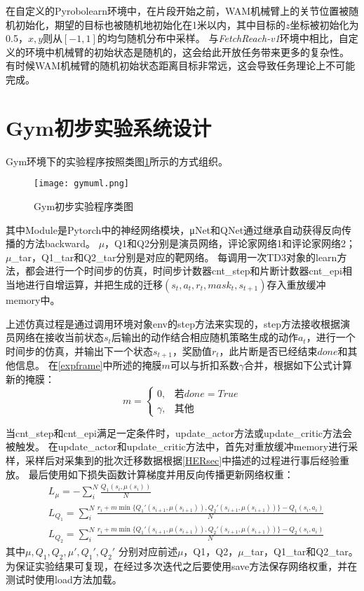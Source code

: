 在自定义的Pyrobolearn环境中，在片段开始之前，WAM机械臂上的关节位置被随机初始化，期望的目标也被随机地初始化在1米以内，其中目标的$z$坐标被初始化为0.5，$x,y$则从$[-1,1]$的均匀随机分布中采样。
与\emph{FetchReach-v1}环境中相比，自定义的环境中机械臂的初始状态是随机的，这会给此开放任务带来更多的复杂性。
有时候WAM机械臂的随机初始状态距离目标非常远，这会导致任务理论上不可能完成。

\section{Gym初步实验系统设计}\label{gymexp}

Gym环境下的实验程序按照类图\ref{gymuml}所示的方式组织。
    \begin{figure}
        \centering
        \texttt{[image: gymuml.png]}
        \caption{Gym初步实验程序类图}
        \label{gymuml}
    \end{figure}
其中Module是Pytorch中的神经网络模块，μNet和QNet通过继承自动获得反向传播的方法backward。
$\mu$，Q1和Q2分别是演员网络，评论家网络1和评论家网络2；$\mu$\_tar，Q1\_tar和Q2\_tar分别是对应的靶网络。
每调用一次TD3对象的learn方法，都会进行一个时间步的仿真，时间步计数器cnt\_step和片断计数器cnt\_epi相当地进行自增运算，并把生成的迁移$(s_t,a_t,r_t,mask_t,s_{t+1})$存入重放缓冲memory中。

上述仿真过程是通过调用环境对象env的step方法来实现的，step方法接收根据演员网络在接收当前状态$s_t$后输出的动作结合相应随机策略生成的动作$a_t$，进行一个时间步的仿真，并输出下一个状态$s_{t+1}$，奖励值$r_t$，此片断是否已经结束$done$和其他信息。
在\ref{expframe}中所述的掩膜$m$可以与折扣系数$\gamma$合并，根据如下公式计算新的掩膜：
\[
m=\begin{cases}
          0, & \text{若} done=True \\
          \gamma, & \text{其他}
\end{cases}
\]

当cnt\_step和cnt\_epi满足一定条件时，update\_actor方法或update\_critic方法会被触发。
在update\_actor和update\_critic方法中，首先对重放缓冲memory进行采样，采样后对采集到的批次迁移数据根据\ref{HERsec}中描述的过程进行事后经验重放。
最后使用如下损失函数计算梯度并用反向传播更新网络权重：
\begin{align}
    & L_\mu = -\sum_i^N\frac{Q_1(s_i, \mu(s_i))}{N} \\
    & L_{Q_1} = \sum_i^N\frac{r_i + m \min\{Q_1'(s_{i+1},\mu(s_{i+1})), Q_2'(s_{i+1},\mu(s_{i+1}))\} - Q_1(s_i,a_i)}{N}\\
    & L_{Q_2} = \sum_i^N\frac{r_i + m \min\{Q_1'(s_{i+1},\mu(s_{i+1})), Q_2'(s_{i+1},\mu(s_{i+1}))\} - Q_2(s_i,a_i)}{N}
\end{align}
其中$\mu, Q_1, Q_2, \mu', Q_1',Q_2'$ 分别对应前述$\mu$，Q1，Q2，$\mu$\_tar，Q1\_tar和Q2\_tar。
为保证实验结果可复现，在经过多次迭代之后要使用save方法保存网络权重，并在测试时使用load方法加载。

